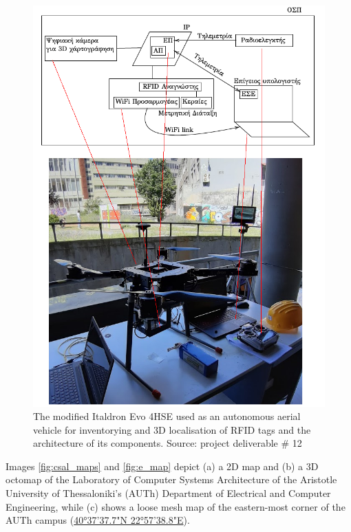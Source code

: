 \begin{figure}[H]\centering
  \includegraphics[scale=0.6]{images/relief/drone/drone_arch_corr.png}
  \caption{\small The modified Italdron Evo 4HSE used as an autonomous aerial
           vehicle for inventorying and 3D localisation of RFID tags and the
           architecture of its components. Source: project deliverable \# 12}
  \label{fig:relief_drone}
\end{figure}

Images \ref{fig:csal_maps} and \ref{fig:e_map} depict (a) a 2D map and (b) a 3D
octomap of the Laboratory of Computer Systems Architecture of the Aristotle
University of Thessaloniki's (AUTh) Department of Electrical and Computer
Engineering, while (c) shows a loose mesh map of the eastern-most corner of
the AUTh campus (\href{https://maps.app.goo.gl/zDzM8HKzkMiFyHMJ6}{40°37'37.7"N
22°57'38.8"E}).

